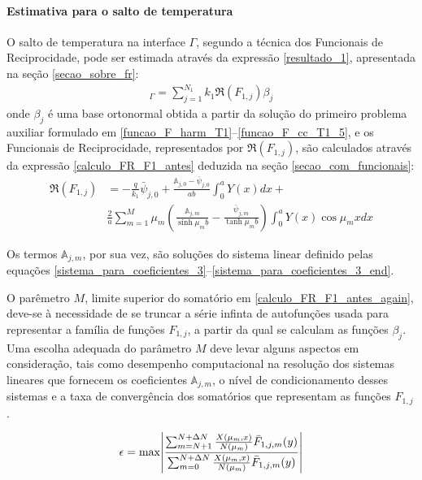 \paragraph{Estimativa para o salto de temperatura}

O salto de temperatura na interface $\Gamma$, segundo a técnica dos Funcionais de Reciprocidade, pode ser estimada através da expressão \eqref{resultado_1}, apresentada na seção \ref{secao_sobre_fr}:
\begin{align}
[T_1 - T_2]_\Gamma = \sum_{j=1}^{N_1} k_1 \Re(F_{1,j}) \beta_j \label{resultado_1_again_2}
\end{align}
onde $\beta_j$ é uma base ortonormal obtida a partir da solução do primeiro problema auxiliar formulado em \eqref{funcao_F_harm_T1}--\eqref{funcao_F_cc_T1_5}, e os Funcionais de Reciprocidade, representados por $\Re(F_{1,j})$, são calculados através da expressão \eqref{calculo_FR_F1_antes} deduzida na seção \ref{secao_com_funcionais}:
\begin{align}
\Re(F_{1,j})
& =
-\frac{q}{k_1}\bar{\psi}_{j,0} + \frac{\mathbb{A}_{j,0} - \bar{\psi}_{j,0}}{ab}\int_0^a Y(x)dx + \nonumber \\
& \frac{2}{a}\sum_{m=1}^M \mu_m \left(\frac{\mathbb{A}_{j,m}}{\sinh\mu_m b} - \frac{\bar{\psi}_{j, m}}{\tanh\mu_m b}\right)\int_0^a Y(x)\cos\mu_m x dx
\label{calculo_FR_F1_antes_again}
\end{align}

Os termos $\mathbb{A}_{j,m}$, por sua vez, são soluções do sistema linear definido pelas equações \eqref{sistema_para_coeficientes_3}--\eqref{sistema_para_coeficientes_3_end}.

O parêmetro $M$, limite superior do somatório em \eqref{calculo_FR_F1_antes_again}, deve-se à necessidade de se truncar a série infinta de autofunções usada para representar a família de funções $F_{1,j}$, a partir da qual se calculam as funções $\beta_j$. Uma escolha adequada do parâmetro $M$ deve levar alguns aspectos em consideração, tais como desempenho computacional na resolução dos sistemas lineares que fornecem os coeficientes $\mathbb{A}_{j,m}$, o nível de condicionamento desses sistemas e a taxa de convergência dos somatórios que representam as funções $F_{1,j}$.

\begin{align}
\epsilon = \max \abs{\frac{\sum_{m=N+1}^{N + \Delta N} \frac{X(\mu_m, x)}{N(\mu_m)}\bar{F}_{1,j,m}(y)}{\sum_{m=0}^{N + \Delta N} \frac{X(\mu_m, x)}{N(\mu_m)}\bar{F}_{1,j,m}(y)}}
\end{align}


